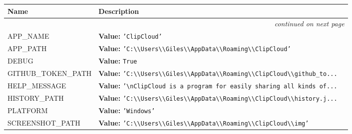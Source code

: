     \vspace{-1cm}
\hspace{\varindent}\begin{longtable}{|p{\varnamewidth}|p{\vardescrwidth}|l}
\cline{1-2}
\cline{1-2} \centering \textbf{Name} & \centering \textbf{Description}& \\
\cline{1-2}
\endhead\cline{1-2}\multicolumn{3}{r}{\small\textit{continued on next page}}\\\endfoot\cline{1-2}
\endlastfoot\raggedright A\-P\-P\-\_\-N\-A\-M\-E\- & \raggedright \textbf{Value:} 
{\tt \texttt{'}\texttt{ClipCloud}\texttt{'}}&\\
\cline{1-2}
\raggedright A\-P\-P\-\_\-P\-A\-T\-H\- & \raggedright \textbf{Value:} 
{\tt \texttt{'}\texttt{C:{\textbackslash}{\textbackslash}Users{\textbackslash}{\textbackslash}Giles{\textbackslash}{\textbackslash}AppData{\textbackslash}{\textbackslash}Roaming{\textbackslash}{\textbackslash}ClipCloud}\texttt{'}}&\\
\cline{1-2}
\raggedright D\-E\-B\-U\-G\- & \raggedright \textbf{Value:} 
{\tt True}&\\
\cline{1-2}
\raggedright G\-I\-T\-H\-U\-B\-\_\-T\-O\-K\-E\-N\-\_\-P\-A\-T\-H\- & \raggedright \textbf{Value:} 
{\tt \texttt{'}\texttt{C:{\textbackslash}{\textbackslash}Users{\textbackslash}{\textbackslash}Giles{\textbackslash}{\textbackslash}AppData{\textbackslash}{\textbackslash}Roaming{\textbackslash}{\textbackslash}ClipCloud{\textbackslash}{\textbackslash}github\_to}\texttt{...}}&\\
\cline{1-2}
\raggedright H\-E\-L\-P\-\_\-M\-E\-S\-S\-A\-G\-E\- & \raggedright \textbf{Value:} 
{\tt \texttt{'}\texttt{{\textbackslash}nClipCloud is a program for easily sharing all kinds of}\texttt{...}}&\\
\cline{1-2}
\raggedright H\-I\-S\-T\-O\-R\-Y\-\_\-P\-A\-T\-H\- & \raggedright \textbf{Value:} 
{\tt \texttt{'}\texttt{C:{\textbackslash}{\textbackslash}Users{\textbackslash}{\textbackslash}Giles{\textbackslash}{\textbackslash}AppData{\textbackslash}{\textbackslash}Roaming{\textbackslash}{\textbackslash}ClipCloud{\textbackslash}{\textbackslash}history.j}\texttt{...}}&\\
\cline{1-2}
\raggedright P\-L\-A\-T\-F\-O\-R\-M\- & \raggedright \textbf{Value:} 
{\tt \texttt{'}\texttt{Windows}\texttt{'}}&\\
\cline{1-2}
\raggedright S\-C\-R\-E\-E\-N\-S\-H\-O\-T\-\_\-P\-A\-T\-H\- & \raggedright \textbf{Value:} 
{\tt \texttt{'}\texttt{C:{\textbackslash}{\textbackslash}Users{\textbackslash}{\textbackslash}Giles{\textbackslash}{\textbackslash}AppData{\textbackslash}{\textbackslash}Roaming{\textbackslash}{\textbackslash}ClipCloud{\textbackslash}{\textbackslash}img}\texttt{'}}&\\

\end{longtable}
